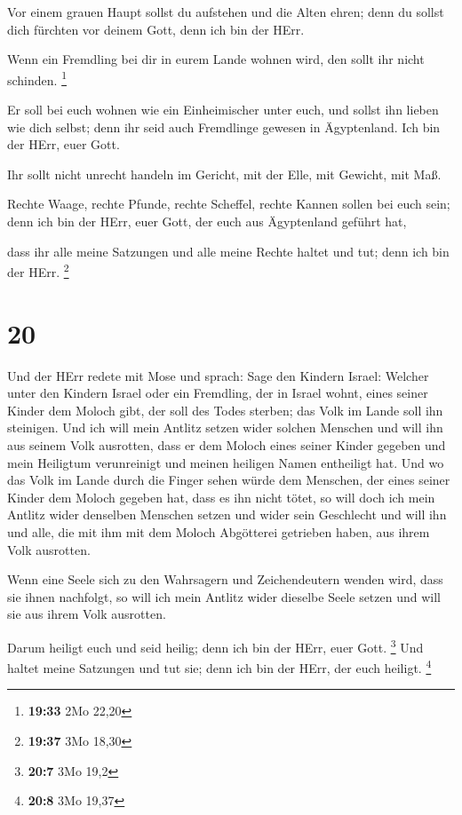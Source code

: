  Vor einem grauen Haupt sollst du aufstehen und die Alten
ehren; denn du sollst dich fürchten vor deinem Gott, denn ich bin der
HErr.

 Wenn ein Fremdling bei dir in eurem Lande wohnen wird, den
sollt ihr nicht schinden. \footnote{\textbf{19:33} 2Mo 22,20}

 Er soll bei euch wohnen wie ein Einheimischer unter euch,
und sollst ihn lieben wie dich selbst; denn ihr seid auch Fremdlinge
gewesen in Ägyptenland. Ich bin der HErr, euer Gott.

 Ihr sollt nicht unrecht handeln im Gericht, mit der Elle,
mit Gewicht, mit Maß.

 Rechte Waage, rechte Pfunde, rechte Scheffel, rechte
Kannen sollen bei euch sein; denn ich bin der HErr, euer Gott, der euch
aus Ägyptenland geführt hat,

 dass ihr alle meine Satzungen und alle meine Rechte haltet
und tut; denn ich bin der HErr. \footnote{\textbf{19:37} 3Mo 18,30}

\hypertarget{section-4}{%
\section{20}\label{section-4}}

 Und der HErr redete mit Mose und sprach:  Sage
den Kindern Israel: Welcher unter den Kindern Israel oder ein Fremdling,
der in Israel wohnt, eines seiner Kinder dem Moloch gibt, der soll des
Todes sterben; das Volk im Lande soll ihn steinigen.  Und
ich will mein Antlitz setzen wider solchen Menschen und will ihn aus
seinem Volk ausrotten, dass er dem Moloch eines seiner Kinder gegeben
und mein Heiligtum verunreinigt und meinen heiligen Namen entheiligt
hat.  Und wo das Volk im Lande durch die Finger sehen würde
dem Menschen, der eines seiner Kinder dem Moloch gegeben hat, dass es
ihn nicht tötet,  so will doch ich mein Antlitz wider
denselben Menschen setzen und wider sein Geschlecht und will ihn und
alle, die mit ihm mit dem Moloch Abgötterei getrieben haben, aus ihrem
Volk ausrotten.

 Wenn eine Seele sich zu den Wahrsagern und Zeichendeutern
wenden wird, dass sie ihnen nachfolgt, so will ich mein Antlitz wider
dieselbe Seele setzen und will sie aus ihrem Volk ausrotten.

 Darum heiligt euch und seid heilig; denn ich bin der HErr,
euer Gott. \footnote{\textbf{20:7} 3Mo 19,2}  Und haltet
meine Satzungen und tut sie; denn ich bin der HErr, der euch heiligt.
\footnote{\textbf{20:8} 3Mo 19,37}

